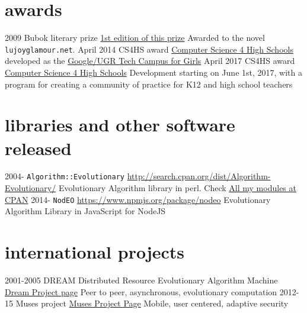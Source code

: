 \documentclass[]{friggeri-jj-cv}
\begin{document}
  \newpage
  
\section{awards}
\begin{entrylist}
 \entry
    {2009}
    {Bubok literary prize}
    {\href{http://cultura.elpais.com/cultura/2009/05/06/actualidad/1241560804_850215.html}{1st
        edition of this prize}}
    {Awarded to the novel {\tt lujoyglamour.net}.}
 \entry
    {April 2014}
    {CS4HS award}
    {\href{http://cs4hs.com}{Computer Science 4 High Schools}}
    {developed as the \href{http://cs4hs.ugr.es}{Google/UGR Tech Campus for Girls}}
 \entry
    {April 2017}
    {CS4HS award}
    {\href{http://cs4hs.com}{Computer Science 4 High Schools}}
    {Development starting on June 1st, 2017, with a program for creating a community of practice for K12 and high school teachers}
\end{entrylist}


\section{libraries and other software released}

\begin{entrylist}
  \entry
    {2004-}
    {{\tt Algorithm::Evolutionary}}
    {\href{http://search.cpan.org/dist/Algorithm-Evolutionary/}{http://search.cpan.org/dist/Algorithm-Evolutionary/}}
    {Evolutionary Algorithm library in
      perl. Check \href{http://search.cpan.org/~jmerelo/}{All my modules at CPAN}}
  \entry
    {2014-}
    {{\tt NodEO}}
    {\href{https://npmjs.org/package/nodeo}{https://www.npmjs.org/package/nodeo}}
    {Evolutionary Algorithm Library in JavaScript for NodeJS}
\end{entrylist}

\section{international projects}

\begin{entrylist}
  \entry
    {2001-2005}
    {{\sf DREAM} Distributed Resource Evolutionary Algorithm Machine}
    {\href{http://www.soc.napier.ac.uk/~benp/dream/dream.htm}{Dream
        Project page}}
    {Peer to peer, asynchronous, evolutionary computation}
  \entry
    {2012-15}
    {Muses project}
    {\href{https://musesproject.eu/}{Muses Project Page}}
    {Mobile, user centered, adaptive security}
\end{entrylist}
\end{document}

